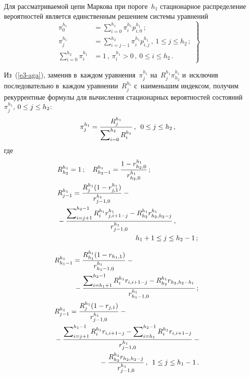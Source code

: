 \begin{multicols}{2}
  Для рассматриваемой цепи Маркова при пороге~$h_1$ стационарное 
распределение вероятностей является единственным решением сис\-те\-мы 
уравнений
  \begin{equation}
  \left.
  \begin{array}{rl}
  \pi_0^{h_1} &= \displaystyle \sum\limits^{h_1}_{i=0} \pi_i^{h_1} 
p^{h_1}_{i,0}\,;\\[6pt]
  \pi_j^{h_1} &= \displaystyle \sum\limits^{h_2}_{i=j-1} \pi_i^{h_1} 
p^{h_1}_{i,j}\,, \ 1\leq j\leq h_2\,;\\[6pt]
  \displaystyle \sum\limits_{i=0}^{h_2} \pi_i^{h_1} &= 1\,,\ \pi_i^{h_1}>0\,,\ 0\leq 
i\leq h_2\,.
  \end{array}
  \right\}
  \label{e3-aga}
  \end{equation}
  
  Из~(\ref{e3-aga}), заменив в~каждом уравнения~$\pi_j^{h_1}$ 
на~$R_j^{h_1}\pi^{h_1}_{h_2}$ и~исключив последовательно в~каждом 
уравнении~$R_j^{h_1}$ с~наименьшим индексом, получим рекуррентные 
формулы для вычисления стационарных вероятностей состояний $\pi_j^{h_1}$, 
$0\hm\leq j\hm\leq h_2$:
 \begin{equation}
  \pi_j^{h_1}=\displaystyle\frac{\displaystyle R_j^{h_1}\mathstrut}{\displaystyle \sum\nolimits_{i=0}^{h_2} R_i^{h_1}\mathstrut}\,,\enskip 
0\leq j\leq h_2\,,
   \label{e4-aga}
\end{equation}
  где
  \begin{align*}
    &R_{h_2}^{h_1} =1\,;\quad R^{h_1}_{h_2-1}=\displaystyle
  \fr{1-r_{h_2,0}^{h_1}}{r^{h_1}_{h_2,0}}\,;\\
   &R_{j-1}^{h_1}= \fr{R_j^{h_1}(1-r^{h_1}_{j,1})}{r^{h_1}_{j-1,0}} -{}\\
   &{}-
\displaystyle\fr{\sum\nolimits_{i=j+1}^{h_2-1} R_i^{h_1} r^{h_1}_{j,i+1-j} -R^{h_1}_{h_2} r^{h_1}_{h_2,h_2-j}}
 {r^{h_1}_{j-1,0}}\,,\\
&\hspace*{40mm}  h_1+1\leq j \leq h_2-1\,;
\end{align*}

\noindent
\begin{align*}
  & R^{h_1}_{h_1-1}=\displaystyle \fr{R^{h_1}_{h_1}(1-r_{h_1,1})}{r^{h_1}_{h_1-1,0}} -{}\\
  &\hspace*{10mm} {}- 
   \fr{\sum\nolimits_{i=h_1+1}^{h_2-1} R_i^{h_1} r_{i,i+1-j} - R^{h_1}_{h_2} r_{h_2,h_2-h_1}} 
{r^{h_1}_{h_1-1,0}}\,;\\
  & R^{h_1}_{j-1} = \displaystyle\fr{R_j^{h_1}(1-r_{j,1})}{r^{h_1}_{j-1,0}}-{}\\
   & {}- \displaystyle\fr{\sum\nolimits_{i=j+1}^{h_1-1} R_i^{h_1} r_{i,i+1-j} - 
\sum\nolimits_{i=h_1}^{h_2-1} R_i^{h_1} r_{i,i+1-j} }{r^{h_1}_{j-1,0}} - {}\\
&\hspace*{23mm}{}- \fr{R^{h_1}_{h_2} r_{h_2,h_2-j}} 
{r^{h_1}_{j-1,0}}\,, \enskip 1\leq j\leq h_1-1\,.
     \end{align*}
  

\end{multicols}
